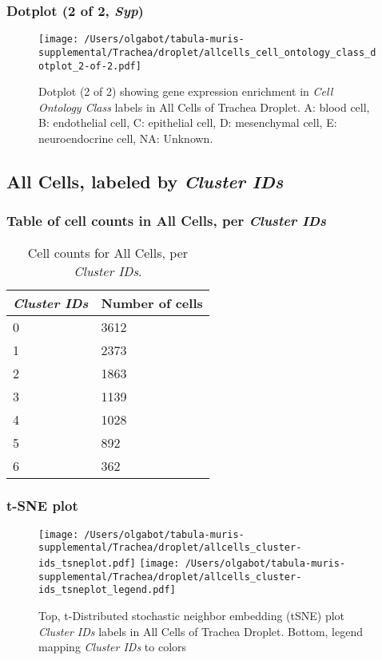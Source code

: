 \clearpage

\subsubsection{Dotplot (2 of 2, \emph{Syp})}
\begin{figure}[h]
\centering
\texttt{[image: /Users/olgabot/tabula-muris-supplemental/Trachea/droplet/allcells\_cell\_ontology\_class\_dotplot\_2-of-2.pdf]}

\caption{ Dotplot (2 of 2)  showing gene expression enrichment in \emph{Cell Ontology Class} labels in All Cells of Trachea Droplet. A: blood cell, B: endothelial cell, C: epithelial cell, D: mesenchymal cell, E: neuroendocrine cell, NA: Unknown.}
\end{figure}


\clearpage

\subsection{All Cells, labeled by \emph{Cluster IDs}}
\subsubsection{Table of cell counts in All Cells, per \emph{Cluster IDs}}\begin{table}[h]
\centering
\label{my-label}
\begin{tabular}{@{}ll@{}}
\toprule

\emph{Cluster IDs}& Number of cells \\ \midrule
0 & 3612 \\

1 & 2373 \\

2 & 1863 \\

3 & 1139 \\

4 & 1028 \\

5 & 892 \\

6 & 362 \\
\bottomrule
\end{tabular}
\caption{Cell counts for All Cells, per \emph{Cluster IDs}.}
\end{table}

\clearpage
\subsubsection{t-SNE plot}
\begin{figure}[h]
\centering
\texttt{[image: /Users/olgabot/tabula-muris-supplemental/Trachea/droplet/allcells\_cluster-ids\_tsneplot.pdf]}
\texttt{[image: /Users/olgabot/tabula-muris-supplemental/Trachea/droplet/allcells\_cluster-ids\_tsneplot\_legend.pdf]}
\caption{Top, t-Distributed stochastic neighbor embedding (tSNE) plot  \emph{Cluster IDs} labels in All Cells of Trachea Droplet. Bottom, legend mapping \emph{Cluster IDs} to colors}
\end{figure}


